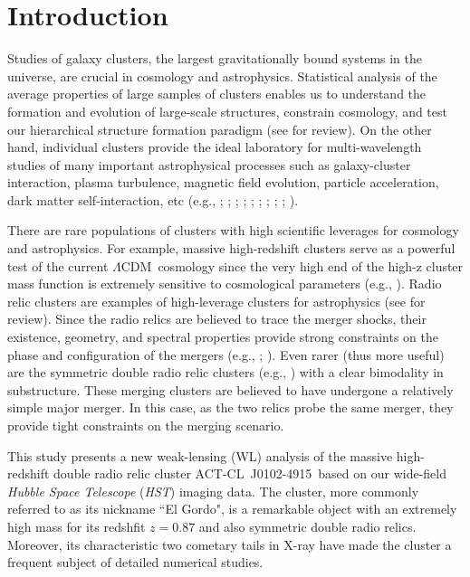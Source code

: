 \documentclass[twocolumn]{aastex631}
\newcommand{\elgordoFULL}{ACT-CL~J0102-4915}
\newcommand{\LCDM}{$\Lambda$CDM}
\newcommand{\HST}{{\it HST}}
\begin{document}
\section{Introduction}
Studies of galaxy clusters, the largest gravitationally bound systems in the universe, are crucial in cosmology and astrophysics. 
Statistical analysis of the average properties of large samples of clusters enables us to understand the formation and evolution of large-scale structures, constrain cosmology, and test our hierarchical structure formation paradigm (see \citealt{KB2012} for review). 
On the other hand, individual clusters provide the ideal laboratory for multi-wavelength studies of many important astrophysical processes such as galaxy-cluster interaction, plasma turbulence, magnetic field evolution, particle acceleration, dark matter self-interaction, etc (e.g., \citealt{Carilli2002}; \citealt{Clarke2006}; \citealt{Clowe2006}; \citealt{Markevitch2007}; \citealt{Jee2015}; \citealt{Stroe2015}; \citealt{vanWeeren2017}; \citealt{Rajpurohit2018}; \citealt{Ichinohe2019}; \citealt{Rojas2021}). 


There are rare populations of clusters with high scientific leverages for cosmology and astrophysics. 
For example, massive high-redshift clusters serve as a powerful test of the current \LCDM~cosmology since the very high end of the high-z cluster mass function is extremely sensitive to cosmological parameters (e.g., \citealt{Allen2011}). 
Radio relic clusters are examples of high-leverage clusters for astrophysics (see \citealt{vanWeeren2019} for review). Since the radio relics are believed to trace the merger shocks, their existence, geometry, and spectral properties provide strong constraints on the phase and configuration of the mergers (e.g., \citealt{Andrade-Santos2019}; \citealt{Wilber2019}). 
Even rarer (thus more useful) are the symmetric double radio relic clusters (e.g., \citealt{Barrena2009}) with a clear bimodality in substructure. These merging clusters are believed to have undergone a relatively simple major merger. In this case, as the two relics probe the same merger, they provide tight constraints on the merging scenario.


This study presents a new weak-lensing (WL) analysis of the massive high-redshift double radio relic cluster \elgordoFULL~based on our wide-field \emph{Hubble Space Telescope} (\HST) imaging data. 
The cluster, more commonly referred to as its nickname ``El Gordo", is a remarkable object with an extremely high mass for its redshfit $z=0.87$ and also symmetric double radio relics. Moreover, its characteristic two cometary tails in X-ray have made the cluster a frequent subject of detailed numerical studies.
\end{document}
